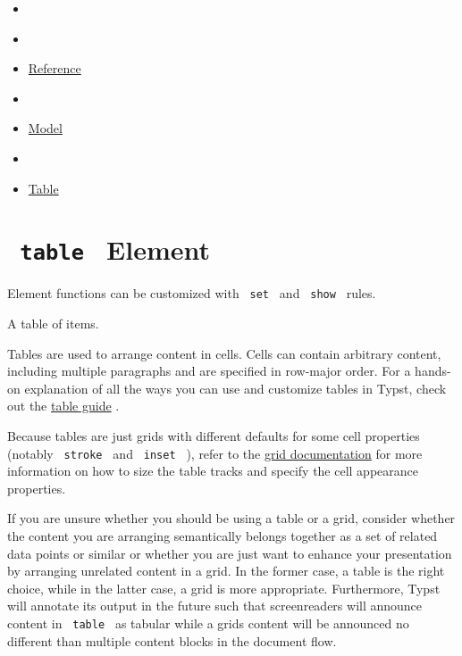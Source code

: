 \begin{itemize}
\tightlist
\item
  \href{/docs}{}
\item
  
\item
  \href{/docs/reference/}{Reference}
\item
  
\item
  \href{/docs/reference/model/}{Model}
\item
  
\item
  \href{/docs/reference/model/table/}{Table}
\end{itemize}

\section{\texorpdfstring{\texttt{\ table\ } {{ Element
}}}{ table   Element }}\label{summary}

\label{element-tooltip}
Element functions can be customized with \texttt{\ set\ } and
\texttt{\ show\ } rules.

A table of items.

Tables are used to arrange content in cells. Cells can contain arbitrary
content, including multiple paragraphs and are specified in row-major
order. For a hands-on explanation of all the ways you can use and
customize tables in Typst, check out the
\href{/docs/guides/table-guide/}{table guide} .

Because tables are just grids with different defaults for some cell
properties (notably \texttt{\ stroke\ } and \texttt{\ inset\ } ), refer
to the \href{/docs/reference/layout/grid/}{grid documentation} for more
information on how to size the table tracks and specify the cell
appearance properties.

If you are unsure whether you should be using a table or a grid,
consider whether the content you are arranging semantically belongs
together as a set of related data points or similar or whether you are
just want to enhance your presentation by arranging unrelated content in
a grid. In the former case, a table is the right choice, while in the
latter case, a grid is more appropriate. Furthermore, Typst will
annotate its output in the future such that screenreaders will announce
content in \texttt{\ table\ } as tabular while a grid\textquotesingle s
content will be announced no different than multiple content blocks in
the document flow.

